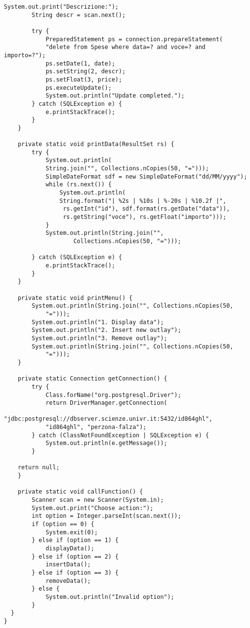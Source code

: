 \documentclass[a4paper, 10pt, titlepage]{article}
\begin{document}
\begin{lstlisting}[tabsize=2]
		System.out.print("Descrizione:");
		String descr = scan.next();
		
		try {
			PreparedStatement ps = connection.prepareStatement(
			"delete from Spese where data=? and voce=? and importo=?");
			ps.setDate(1, date);
			ps.setString(2, descr);
			ps.setFloat(3, price);
			ps.executeUpdate();
			System.out.println("Update completed.");
		} catch (SQLException e) {
			e.printStackTrace();
		}
	}
	
	private static void printData(ResultSet rs) {
		try {
			System.out.println(
			String.join("", Collections.nCopies(50, "=")));
			SimpleDateFormat sdf = new SimpleDateFormat("dd/MM/yyyy");
			while (rs.next()) {
				System.out.println(
				String.format("| %2s | %10s | %-20s | %10.2f |",
				 rs.getInt("id"), sdf.format(rs.getDate("data")), 
				 rs.getString("voce"), rs.getFloat("importo")));
			}
			System.out.println(String.join("", 
					Collections.nCopies(50, "=")));
		
		} catch (SQLException e) {
			e.printStackTrace();
		}
	}
	
	private static void printMenu() {
		System.out.println(String.join("", Collections.nCopies(50,
			"=")));
		System.out.println("1. Display data");
		System.out.println("2. Insert new outlay");
		System.out.println("3. Remove outlay");
		System.out.println(String.join("", Collections.nCopies(50, 
			"=")));
	}
	
	private static Connection getConnection() {
		try {
			Class.forName("org.postgresql.Driver");
			return DriverManager.getConnection(
			"jdbc:postgresql://dbserver.scienze.univr.it:5432/id864ghl",
			"id864ghl", "perzona-falza");
		} catch (ClassNotFoundException | SQLException e) {
			System.out.println(e.getMessage());
		}
	
	return null;
	}
	
	private static void callFunction() {
		Scanner scan = new Scanner(System.in);
		System.out.print("Choose action:");
		int option = Integer.parseInt(scan.next());
		if (option == 0) {
			System.exit(0);
		} else if (option == 1) {
			displayData();
		} else if (option == 2) {
			insertData();
		} else if (option == 3) {
			removeData();
		} else {
			System.out.println("Invalid option");
		}
  }
}
\end{lstlisting}

\newpage
\end{document}
